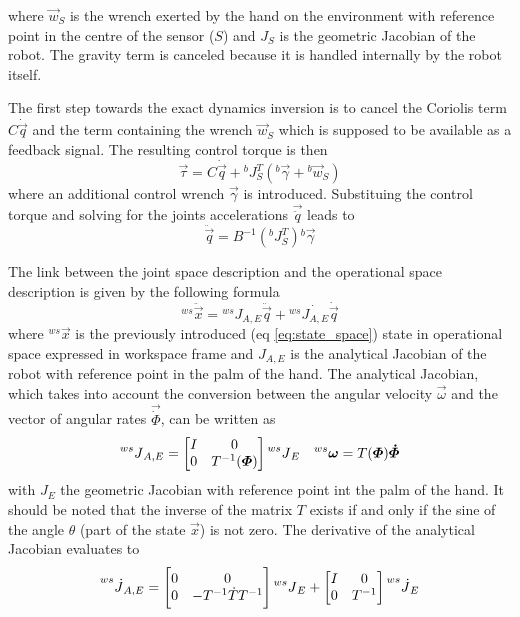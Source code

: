 where $\vec{w}_{S}$ is the wrench exerted by the hand on the environment
with reference point in the centre
of the sensor ($S$) and $J_{S}$ is the geometric Jacobian of the robot.
The gravity term is canceled because it is handled internally by the robot itself.
\par
The first step towards the exact dynamics inversion is to cancel the Coriolis term
$C \dot{\vec{q}}$ and the term containing the wrench $\vec{w}_{S}$ which is supposed to
be available as a feedback signal. The resulting control torque is then
\[
\vec{\tau} = C \dot{\vec{q}} + {}^{b}J^{T}_{S} ({}^b\vec{\gamma} + {}^b\vec{w}_{S})
\]
where an additional control wrench $\vec{\gamma}$ is introduced.
Substituing the control torque and solving for the joints accelerations $\vec{\ddot{q}}$
leads to
\begin{equation}\label{eq:qddot}
  \ddot{\vec{q}} = B^{-1} ({}^{b}J^{T}_{S}) {}^b\vec{\gamma}
\end{equation}
\par
The link between the joint space description and the operational space description
is given by the following formula
\begin{equation}
  \label{eq:ws_a}
  {}^{ws} \ddot{\vec{x}} = {}^{ws} J_{A,E} \ddot{\vec{q}} + {}^{ws} \dot{J_{A,E}} \dot{\vec{q}}
\end{equation}
where ${}^{ws} \vec{x}$ is the previously introduced (eq \ref{eq:state_space}) state in operational space expressed in workspace
frame and $J_{A,E}$ is the analytical Jacobian of the robot with reference point in the palm of the hand.
The analytical Jacobian, which takes into account the conversion between the angular velocity $\vec{\omega}$
and the vector of angular rates $\vec{\dot{\Phi}}$, can be written as
\[
\prescript{ws}{}{J}_{A,E} = 
\begin{bmatrix}
  I & 0 \\
  0 & T^{-1}(\vec{\Phi})
\end{bmatrix}
\prescript{ws}{}{J}_{E} \quad {}^{ws}\vec{\omega} = T(\vec{\Phi}) \vec{\dot{\Phi}}
\]
with $J_E$ the geometric Jacobian with reference point int the palm of the hand. It should be noted
that the inverse of the matrix $T$ exists if and only if the sine of the angle $\theta$ (part of the state
$\vec{x}$) is not zero. The derivative of the analytical Jacobian evaluates to
\[
\prescript{ws}{}{\dot{J}}_{A,E} = 
\begin{bmatrix}
  0 & 0 \\
  0 & -T^{-1} \dot{T} T^{-1}
\end{bmatrix}
\prescript{ws}{}{J}_{E} + 
\begin{bmatrix}
  I & 0 \\
  0 & T^{-1}
\end{bmatrix}
\prescript{ws}{}{\dot{J}}_{E}
\]
